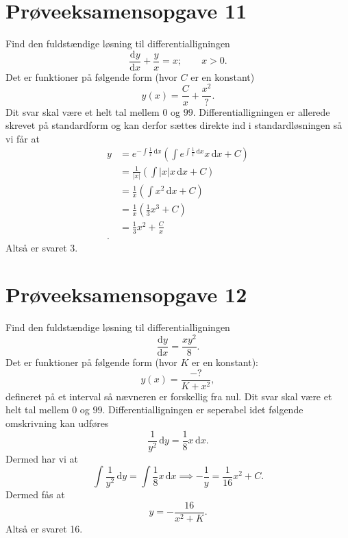 \documentclass[12pt]{article}
\begin{document}
\section*{Prøveeksamensopgave 11}
Find den fuldstændige løsning til differentialligningen
\[
\frac{\mathrm{d}y}{\mathrm{d}x} + \frac{y}{x} = x; \qquad x>0
.\] 
Det er funktioner på følgende form (hvor $C$ er en konstant)
\[
y(x) = \frac{C}{x} + \frac{x^2}{?}
.\] 
Dit svar skal være et helt tal mellem $\num{0}$ og $\num{99}$.
\bigbreak
Differentialligningen er allerede skrevet på standardform og kan derfor sættes direkte ind i standardløsningen så vi får at
\begin{align*}
  y &= e^{- \int \frac{1}{x} \, \mathrm{d}x} \left( \int e ^{\int \frac{1}{x} \, \mathrm{d}x} x \, \mathrm{d}x + C \right)  \\
  &= \frac{1}{|x|} \left( \int |x| x \, \mathrm{d}x + C \right)  \\
  &= \frac{1}{x} \left( \int x^2 \, \mathrm{d}x + C \right)  \\
  &= \frac{1}{x}\left( \frac{1}{3}x^3 + C \right)  \\
  &= \frac{1}{3}x^2 + \frac{C}{x}\\
.\end{align*} 
Altså er svaret \num{3}.



\section*{Prøveeksamensopgave 12}
Find den fuldstændige løsning til differentialligningen
\[
\frac{\mathrm{d}y}{\mathrm{d}x} = \frac{xy^2}{8}
.\]
Det er funktioner på følgende form (hvor $K$ er en konstant):
 \[
y(x) = \frac{-?}{K+x^2}
,\] 
defineret på et interval så nævneren er forskellig fra nul.
Dit svar skal være et helt tal mellem $0$ og $99$.
\bigbreak
Differentialligningen er seperabel idet følgende omskrivning kan udføres
\[
\frac{1}{y^2} \, \mathrm{d}y = \frac{1}{8}x \, \mathrm{d}x
.\]
Dermed har vi at
\[
\int \frac{1}{y^2} \, \mathrm{d}y = \int \frac{1}{8}x \, \mathrm{d}x \implies - \frac{1}{y} = \frac{1}{16}x^2 + C
.\] 
Dermed fås at
\[
y = -\frac{16}{x^2+K}
.\]
Altså er svaret 16.
\end{document}
